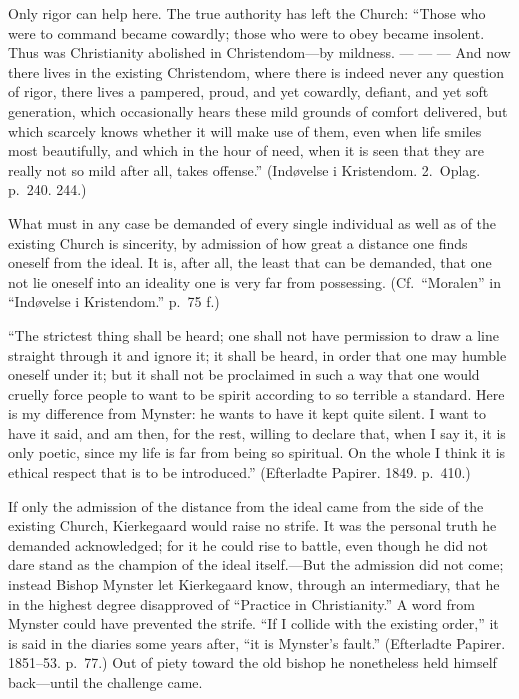 \documentclass[12pt,a4paper]{book}
\newcommand{\opage}[1]{\marginnote{\footnotesize\textit{[#1]}}}
\begin{document}
Only rigor can help here. The true authority has left the Church:
``Those who were to command became cowardly; those who were to obey
became insolent. Thus was Christianity abolished in Christendom---by
mildness. --- --- --- And now there lives in the existing Christendom,
where there is indeed never any question of rigor, there lives a
pampered, proud, and yet cowardly, defiant, and yet soft generation,
which occasionally hears these mild grounds of comfort delivered, but
which scarcely knows whether it will make use of them, even when life
smiles most beautifully, and which in the hour of need, when it is seen
that they are really not so mild after all, takes offense.'' (Indøvelse
i Kristendom. 2.~Oplag. p.~240. 244.)

What must in any case be demanded of every single individual as well as
of the existing Church is sincerity, by admission of how great a
distance one finds oneself from the ideal. It is, after all, the least
that can be demanded, that one not lie oneself into an ideality one is
very far from possessing. (Cf.\ ``Moralen'' in ``Indøvelse i
Kristendom.'' p.~75 f.)

``The strictest thing shall be heard; one shall not have permission to
draw a line straight through it and ignore it; it shall be heard, in
order that one may humble oneself under it; but it shall not be
proclaimed in such a way that one would cruelly force people to want to
be spirit according to so terrible a standard. Here is my difference
from Mynster: he wants to have it kept quite silent. I want to have it
said, and am then, for the rest, willing to declare that, when I
\opage{136}say it, it is only poetic, since my life is far from being so
spiritual. On the whole I think it is ethical respect that is to be
introduced.'' (Efterladte Papirer. 1849. p.~410.)

If only the admission of the distance from the ideal came from the side
of the existing Church, Kierkegaard would raise no strife. It was the
personal truth he demanded acknowledged; for it he could rise to battle,
even though he did not dare stand as the champion of the ideal
itself.---But the admission did not come; instead Bishop Mynster let
Kierkegaard know, through an intermediary, that he in the highest degree
disapproved of ``Practice in Christianity.'' A word from Mynster could
have prevented the strife. ``If I collide with the existing order,'' it
is said in the diaries some years after, ``it is Mynster's fault.''
(Efterladte Papirer. 1851--53. p.~77.) Out of piety toward the old
bishop he nonetheless held himself back---until the challenge came.
\end{document}
